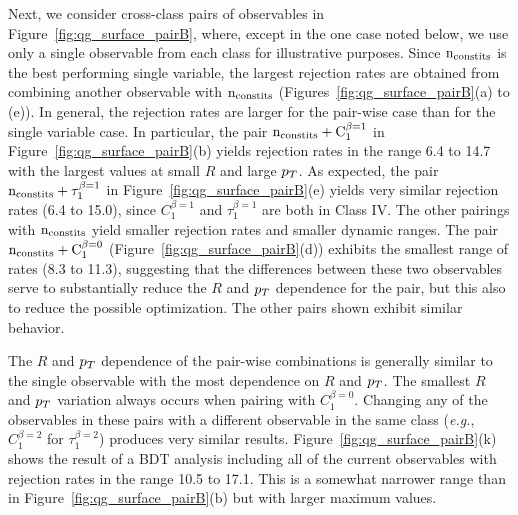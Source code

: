Next, we consider  cross-class pairs of observables  in Figure~\ref{fig:qg_surface_pairB}, where, except in the one case noted below,
we use only a single observable from each class for illustrative purposes.
Since $\rm n_{\rm constits}$ is the best performing single variable, the largest rejection
rates are obtained from combining another observable with $\rm{n_ {\rm
    constits}}$ (Figures~\ref{fig:qg_surface_pairB}(a) to (e)).  
In general, the rejection rates are larger for the pair-wise case
than for the single variable case.  In particular, the pair $\rm{n_{\rm constits}}+ C_1^{\beta=1}$ in Figure~\ref{fig:qg_surface_pairB}(b)
yields rejection rates in the range 6.4 to 14.7 with the largest
values at small $R$ and large $p_T$.  As expected, the pair  $\rm{n_{\rm constits}}+ \tau_1^{\beta=1}$ in Figure~\ref{fig:qg_surface_pairB}(e)
yields very similar rejection rates (6.4 to 15.0), since $C_1^{\beta=1}$ and $\tau_1^{\beta=1}$ are both in Class IV. 
The other pairings with $\rm{n_{\rm constits}}$ yield smaller 
rejection rates and smaller dynamic ranges.  The pair $\rm{n_ {\rm constits}}+ C_1^{\beta=0}$ (Figure~\ref{fig:qg_surface_pairB}(d)) exhibits
the smallest range of rates (8.3 to 11.3), suggesting that the differences between these two observables serve to substantially 
reduce the $R$ and $p_T$ dependence for the pair, but this also to reduce the possible optimization.  The other pairs shown exhibit
similar behavior.  

The $R$ and $p_T$ dependence of the pair-wise combinations is generally similar to the single observable with the most dependence 
on $R$ and $p_T$.  The smallest $R$ and $p_T$ variation always occurs 
when pairing with $C_1^{\beta=0}$.  Changing any of the observables in these pairs with a different observable in the same class (\textit{e.g.},
$C_1^{\beta=2}$ for $\tau_1^{\beta=2}$) produces very similar results.  Figure~\ref{fig:qg_surface_pairB}(k) shows the
result of a BDT analysis including all of the current observables with rejection rates in the range 10.5 to 17.1.  This is a somewhat narrower range
than in Figure~\ref{fig:qg_surface_pairB}(b) but with  larger maximum values.

